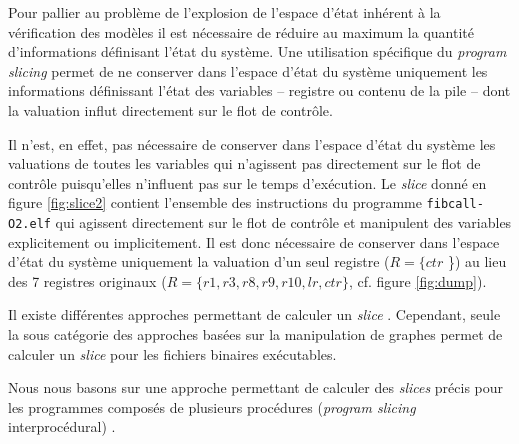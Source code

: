 
    Pour pallier au problème de l'explosion de l'espace d'état inhérent à la
    vérification des modèles il est nécessaire de réduire au maximum la quantité
    d'informations définisant l'état du système. Une utilisation spécifique du
    \emph{program slicing} permet de ne conserver dans l'espace d'état
    du système uniquement les informations définissant l'état des variables --
    registre ou contenu de la pile -- dont la valuation influt directement sur
    le flot de contrôle.

    Il n'est, en effet, pas nécessaire de conserver dans l'espace d'état du
    système les valuations de toutes les variables qui n'agissent pas
    directement sur le flot de contrôle puisqu'elles n'influent pas sur le temps
    d'exécution. Le \emph{slice} donné en figure \ref{fig:slice2} contient
    l'ensemble des instructions du programme \texttt{fibcall-O2.elf} qui agissent
    directement sur le flot de contrôle et manipulent des variables explicitement
    ou implicitement. Il est donc nécessaire de conserver dans l'espace d'état
    du système uniquement la valuation d'un seul registre ($R = \{ ctr$ \}) au
    lieu des 7 registres originaux ($R = \{r1, r3, r8, r9, r10, lr, ctr\}$,
    cf. figure \ref{fig:dump}).
     
    \vspace{1em}
  

    Il existe différentes approches permettant de calculer un \emph{slice}
    \cite{Tip95}.  Cependant, seule la sous catégorie des approches basées sur
    la manipulation de graphes permet de calculer un \emph{slice} pour les
    fichiers binaires exécutables.
    
    Nous nous basons sur une approche permettant de calculer des \emph{slices}
    précis pour les programmes composés de plusieurs procédures (\emph{program
      slicing} interprocédural) \cite{KJL03}.
    

    
